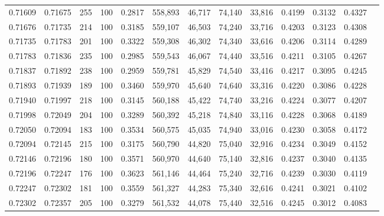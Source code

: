 \begin{tabular}{rrrrrrrrrrrrr}
0.71609 & 0.71675 &   255 & 100 &                                     0.2817 & 558,893 &  46,717 &  74,140 &  33,816 & 0.4199 & 0.3132 & 0.4327 \\
0.71676 & 0.71735 &   214 & 100 &                                     0.3185 & 559,107 &  46,503 &  74,240 &  33,716 & 0.4203 & 0.3123 & 0.4308 \\
0.71735 & 0.71783 &   201 & 100 &                                     0.3322 & 559,308 &  46,302 &  74,340 &  33,616 & 0.4206 & 0.3114 & 0.4289 \\
0.71783 & 0.71836 &   235 & 100 &                                     0.2985 & 559,543 &  46,067 &  74,440 &  33,516 & 0.4211 & 0.3105 & 0.4267 \\
0.71837 & 0.71892 &   238 & 100 &                                     0.2959 & 559,781 &  45,829 &  74,540 &  33,416 & 0.4217 & 0.3095 & 0.4245 \\
0.71893 & 0.71939 &   189 & 100 &                                     0.3460 & 559,970 &  45,640 &  74,640 &  33,316 & 0.4220 & 0.3086 & 0.4228 \\
0.71940 & 0.71997 &   218 & 100 &                                     0.3145 & 560,188 &  45,422 &  74,740 &  33,216 & 0.4224 & 0.3077 & 0.4207 \\
0.71998 & 0.72049 &   204 & 100 &                                     0.3289 & 560,392 &  45,218 &  74,840 &  33,116 & 0.4228 & 0.3068 & 0.4189 \\
0.72050 & 0.72094 &   183 & 100 &                                     0.3534 & 560,575 &  45,035 &  74,940 &  33,016 & 0.4230 & 0.3058 & 0.4172 \\
0.72094 & 0.72145 &   215 & 100 &                                     0.3175 & 560,790 &  44,820 &  75,040 &  32,916 & 0.4234 & 0.3049 & 0.4152 \\
0.72146 & 0.72196 &   180 & 100 &                                     0.3571 & 560,970 &  44,640 &  75,140 &  32,816 & 0.4237 & 0.3040 & 0.4135 \\
0.72196 & 0.72247 &   176 & 100 &                                     0.3623 & 561,146 &  44,464 &  75,240 &  32,716 & 0.4239 & 0.3030 & 0.4119 \\
0.72247 & 0.72302 &   181 & 100 &                                     0.3559 & 561,327 &  44,283 &  75,340 &  32,616 & 0.4241 & 0.3021 & 0.4102 \\
0.72302 & 0.72357 &   205 & 100 &                                     0.3279 & 561,532 &  44,078 &  75,440 &  32,516 & 0.4245 & 0.3012 & 0.4083 \\

\end{tabular}
